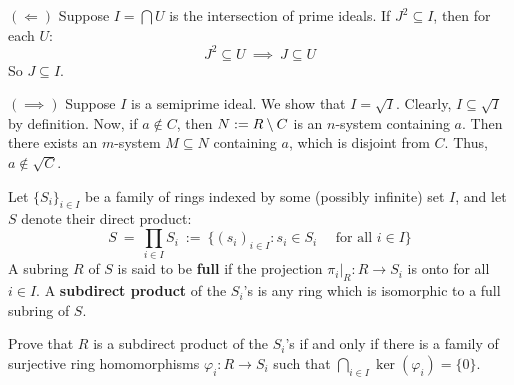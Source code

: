 \begin{pf}
	$(\Longleftarrow)$ Suppose $I=\bigcap U$ is the intersection of prime ideals.
	If $J^{2}\subseteq I$, then for each $U$:
	\begin{equation*}
		J^{2}\subseteq U \ \implies \ J\subseteq U
	\end{equation*}
	So $J\subseteq I$.

	$(\implies)$ Suppose $I$ is a semiprime ideal. We show that $I=\sqrt{I}$.
	Clearly, $I\subseteq\sqrt{I}$ by definition.
	Now, if $a\notin C$, then $N:=R\setminus C$ is an $n$-system containing $a$.
	Then there exists an $m$-system $M\subseteq N$ containing $a$, which is
	disjoint from $C$. Thus, $a\notin\sqrt{C}$.
\end{pf}


\nq
\begin{exr}[title=Subdirect Products]
	Let $\{S_i\}_{i\in I}$ be a family of rings indexed by some (possibly infinite)
	set $I$, and let $S$ denote their direct product:
	\begin{equation*}
		S \ = \ \prod_{i\in I}S_i \ := \ \{(s_i)_{i\in I} : s_i\in S_i\quad \text{ for all $i\in I$}\}
	\end{equation*}
	A subring $R$ of $S$ is said to be \textbf{full} if the projection
	$\pi_i\vert_R:R\rightarrow S_i$ is onto for all $i\in I$.
	A \textbf{subdirect product} of the $S_i$'s is any ring which is isomorphic to
	a full subring of $S$.

	Prove that $R$ is a subdirect product of the $S_i$'s if and only if
	there is a family of surjective ring homomorphisms $\varphi_i:R\rightarrow S_i$
	such that $\bigcap_{i\in I} \ker(\varphi_i)=\{0\}$.
\end{exr} \

